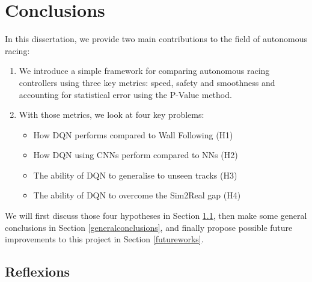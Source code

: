 
\chapter{Conclusions} %

\label{Chapter8} %



In this dissertation, we provide two main contributions to the field of autonomous racing:

\begin{enumerate}
	\item We introduce a simple framework for comparing autonomous racing controllers using three key metrics: speed, safety and smoothness and accounting for statistical error using the P-Value method.
	\item With those metrics, we look at four key problems:
	\begin{itemize}
		\item How DQN performs compared to Wall Following (H1)
		\item How DQN using CNNs perform compared to NNs (H2)
		\item The ability of DQN to generalise to unseen tracks (H3)
		\item The ability of DQN to overcome the Sim2Real gap (H4)
	\end{itemize}
\end{enumerate}

We will first discuss those four hypotheses in Section \ref{reflexions}, then make some general conclusions in Section \ref{generalconclusions}, and finally propose possible future improvements to this project in Section \ref{futureworks}.

\section{Reflexions}
\label{reflexions}

